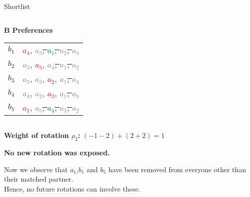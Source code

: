 \documentclass[aspectratio=169,xcolor=dvipsnames]{beamer}
\begin{document}
\begin{frame}{Shortlist}
\begin{columns}[t]
  \begin{column}{0.45\textwidth}
    \textbf{B Preferences}\\[6pt]
    \begin{tabular}{r@{: }l}
      $b_1$ & \textcolor{red}{$a_4$}, \sout{\textcolor{gray}{$a_3$}, \textcolor{green}{$a_1$}, \textcolor{gray}{$a_2$}, \textcolor{gray}{$a_5$}} \\
      $b_2$ & \textcolor{gray}{$a_3$}, \textcolor{red}{$a_5$}, \sout{\textcolor{gray}{$a_4$}, \textcolor{gray}{$a_1$}, \textcolor{gray}{$a_2$}} \\
      $b_3$ & \textcolor{gray}{$a_5$}, \textcolor{gray}{$a_3$}, \textcolor{red}{$a_2$}, \sout{\textcolor{gray}{$a_1$}, \textcolor{gray}{$a_4$}} \\
      $b_4$ & \textcolor{gray}{$a_4$}, \textcolor{gray}{$a_2$}, \textcolor{red}{$a_3$}, \sout{\textcolor{gray}{$a_1$}, \textcolor{gray}{$a_5$}} \\
      $b_5$ & \textcolor{red}{$a_1$}, \sout{\textcolor{gray}{$a_5$}, \textcolor{green}{$a_4$}, \textcolor{gray}{$a_3$}, \textcolor{gray}{$a_2$}} \\
    \end{tabular}
  \end{column}
\end{columns}


\vspace{1em}
\pause
\textbf{Weight of rotation \( \rho_2 \):} \( (-1 -2) + (2 + 2) = 1 \)

\pause
\textbf{No new rotation was exposed.}

\pause
Now we observe that \( a_1 \),\( b_1 \) and \( b_5 \) have been removed from everyone other than their matched partner.\\
Hence, no future rotations can involve these.

\end{frame}
\end{document}
